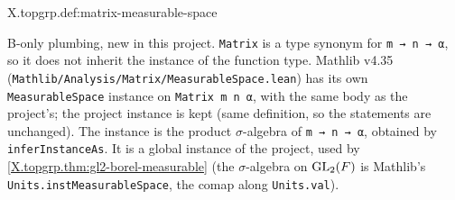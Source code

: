 \begin{definition}
\bonly
{}
\end{definition}
\begin{tfformal}{X.topgrp.def:matrix-measurable-space}
\begin{tffidelity}
B-only plumbing, new in this project. \texttt{Matrix} is a type synonym for \texttt{m → n → α}, so it does not inherit the instance of the function type. Mathlib v4.35 (\texttt{Mathlib/Analysis/Matrix/MeasurableSpace.lean}) has its own \texttt{MeasurableSpace} instance on \texttt{Matrix m n α}, with the same body as the project's; the project instance is kept (same definition, so the statements are unchanged). The instance is the product $\sigma$-algebra of \texttt{m → n → α}, obtained by \texttt{inferInstanceAs}. It is a global instance of the project, used by \cref{X.topgrp.thm:gl2-borel-measurable} (the $\sigma$-algebra on $\mathrm{GL}_2(F)$ is Mathlib's \texttt{Units.instMeasurableSpace}, the comap along \texttt{Units.val}).
\end{tffidelity}
\end{tfformal}

